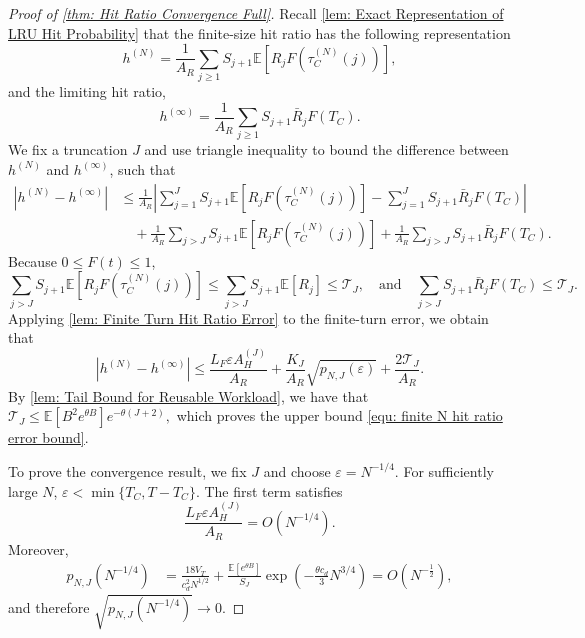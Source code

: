 \documentclass{article}
\theoremstyle{definition}
\newcommand{\E}{\mathbb E}
\begin{document}
    
\begin{proof}[Proof of \cref{thm: Hit Ratio Convergence Full}]
    Recall \cref{lem: Exact Representation of LRU Hit Probability} that the finite-size hit ratio has the following representation
    \begin{equation*}
    h ^{(N)} = \frac{1}{A_R} \sum_{j\geq1} S_{j+1} \E\left[R_j F\left(\tau_C^{(N)}(j)\right)\right],
    \end{equation*}
    and the limiting hit ratio,
    \begin{equation*}
    h ^{(\infty)} = \frac{1}{A_R} \sum_{j\geq1} S_{j+1}\bar R_j F(T_C).
    \end{equation*}
    We fix a truncation $J$ and use triangle inequality to bound the difference between $h ^{(N)}$ and $h ^{(\infty)}$, such that
    \begin{align*}
        \left|h ^{(N)} -h ^{(\infty)}  \right|
        &\leq \frac{1}{A_R}\left|\sum_{j=1}^{J}S_{j+1}\E\left[R_j F\left(\tau_C^{(N)}(j)\right)\right]-
        \sum_{j=1}^{J}S_{j+1}\bar R_j F(T_C)\right| \\
        &\quad+\frac{1}{A_R}\sum_{j>J}S_{j+1}\E\left[R_j F\left(\tau_C^{(N)}(j)\right)\right]+\frac{1}{A_R} \sum_{j>J}S_{j+1}\bar R_j F(T_C).
    \end{align*}
    Because $0\leq F(t)\leq1$,
    \begin{equation*}
        \sum_{j>J}S_{j+1}\E\left[R_j F\left(\tau_C^{(N)}(j)\right)\right]\leq \sum_{j>J}S_{j+1}\E\left[R_j\right] \leq \mathcal T_J,\quad\text{and} \quad \sum_{ j>J}S_{j+1}\bar R_j F(T_C)\leq\mathcal T_J.
    \end{equation*}
    Applying \cref{lem: Finite Turn Hit Ratio Error} to the finite-turn error, we obtain that
    \begin{equation*}
        \left|h ^{(N)} -h ^{(\infty)}  \right| \leq
        \frac{L_F \varepsilon A_H^{(J)}}{A_R} + \frac{K_J}{A_R}\sqrt{p_{N,J}(\varepsilon)} + \frac{2\mathcal T_J}{A_R}.
    \end{equation*}
    By \cref{lem: Tail Bound for Reusable Workload}, we have that $\mathcal T_J\leq\E[B^2e^{\theta B}]e^{-\theta(J+2)},$ which proves the upper bound \eqref{equ: finite N hit ratio error bound}.
    
    To prove the convergence result, we fix $J$ and choose $\varepsilon=N^{-1/4}$. For sufficiently large $N$, $\varepsilon<\min\{T_C,T-T_C\}$. The first term satisfies
    \begin{equation*}
        \frac{L_F \varepsilon A_H^{(J)}}{A_R}=O(N^{-1/4}).
    \end{equation*}
    Moreover,
    \begin{align*}
        p_{N,J}(N^{-1/4}) &= \frac{18V_T}{c_d^2N^{1/2}} + \frac{\E[e^{\theta B}]}{S_J} \exp\left(-\frac{\theta c_d}{3}N^{3/4}\right) = O(N^{-\frac{1}{2}}), 
    \end{align*}
    and therefore $\sqrt{p_{N,J}(N^{-1/4})}\rightarrow0.$
    

\end{proof}
\end{document}
